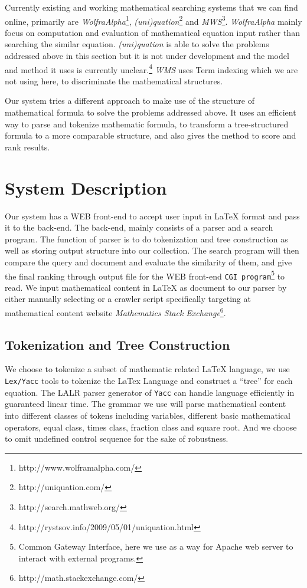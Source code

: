 \documentclass{acm_proc_article-sp}
\begin{document}
Currently existing and working mathematical searching systems that we can find online, primarily are \textit{WolfraAlpha}\footnote{http://www.wolframalpha.com/}, \textit{(uni)quation}\footnote{http://uniquation.com/} and \textit{MWS}\footnote{http://search.mathweb.org/}. \textit{WolfraAlpha} mainly focus on computation and evaluation of mathematical equation input rather than searching the similar equation. \textit{(uni)quation} is able to solve the problems addressed above in this section but it is not under development and the model and method it uses is currently unclear.\footnote{http://rystsov.info/2009/05/01/uniquation.html} \textit{WMS} uses Term indexing\cite{McCune, Stickel} which we are not using here, to discriminate the mathematical structures.

Our system tries a different approach to make use of the structure of mathematical formula to solve the problems addressed above. It uses an efficient way to parse and tokenize mathematic formula, to transform a tree-structured formula to a more comparable structure, and also gives the method to score and rank results.

\section{System Description}
Our system has a WEB front-end to accept user input in \LaTeX{} format and pass it to the back-end. The back-end, mainly consists of a parser and a search program. The function of parser is to do tokenization and tree construction as well as storing output structure into our collection. The search program will then compare the query and document and evaluate the similarity of them, and give the final ranking through output file for the WEB front-end \texttt{CGI program}\footnote{Common Gateway Interface, here we use as a way for Apache web server to interact with external programs.} to read. We input mathematical content in \LaTeX{} as document to our parser by either manually selecting or a crawler script specifically targeting at mathematical content website \textit{Mathematics Stack Exchange}\footnote{http://math.stackexchange.com/}.

\subsection{Tokenization and Tree Construction}
We choose to tokenize a subset of mathematic related \LaTeX{} language, we use \texttt{Lex/Yacc} tools to tokenize the LaTex Language and construct a ``tree'' for each equation. The LALR parser generator of \texttt{Yacc} can handle language efficiently in guaranteed linear time\cite{Knuth}. The grammar we use will parse mathematical content into different classes of tokens including variables, different basic mathematical operators, equal class, times class, fraction class and square root. And we choose to omit undefined control sequence for the sake of robustness. 
\end{document}
